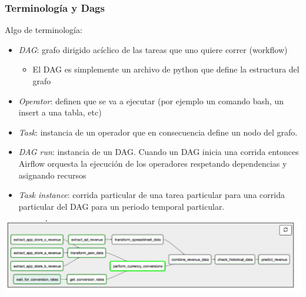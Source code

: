 \documentclass[leqno, 10pt, envcountsect]{beamer}
\numberwithin{equation}{section}
\theoremstyle{definition}
\theoremstyle{example}
\numberwithin{figure}{section}
\numberwithin{table}{section}
\let\olditem\item
\renewcommand{\item}{%
\olditem\vspace{1pt}}
\begin{document}
\begin{frame}[fragile=singleslide]
  \frametitle{Terminología y Dags}
  Algo de terminología:
  \begin{itemize}
    \item \textit{DAG}: grafo dirigido acíclico de las tareas que uno quiere
      correr (workflow)
      \begin{itemize}
        \item El DAG es simplemente un archivo de python
          que define la estructura del grafo
      \end{itemize}
    \item \textit{Operator}: definen que se va a ejecutar (por ejemplo un comando bash, un insert a una tabla, etc)
    \item \textit{Task}: instancia de un operador que en consecuencia
      define un nodo del grafo.
    \item \textit{DAG run}: instancia de un DAG. Cuando un DAG inicia una
      corrida entonces Airflow orquesta la ejecución de los operadores
      respetando dependencias y asignando recursos
  \item \textit{Task instance}: corrida particular de una tarea particular
    para una corrida particular del DAG para un periodo temporal
      particular.
  \end{itemize}
  \begin{center}
    \includegraphics[scale=0.2]{dag_graph_view.png}
  \end{center}
\end{frame}
\end{document}
